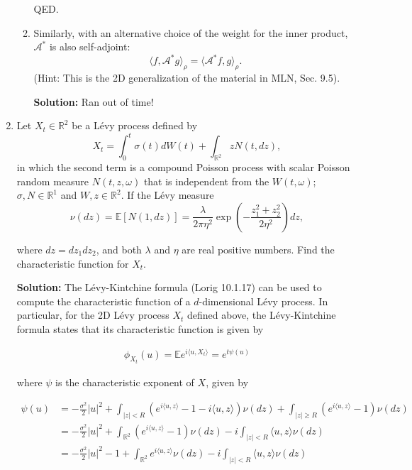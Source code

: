 \documentclass[12pt, a4paper]{article}
\begin{document}
\begin{enumerate}
\begin{enumerate}
        QED.


        \item Similarly, with an alternative choice of the weight for the inner product, $\mathcal A^*$ is also self-adjoint: $$\langle f, \mathcal A^* g \rangle_\rho = \langle \mathcal A^* f, g \rangle_\rho.$$
        (Hint: This is the 2D generalization of the material in MLN, Sec. 9.5).

        \textbf{Solution:} Ran out of time! 
        

    \end{enumerate}

    \item Let $X_t \in \mathbb R^2$ be a Lévy process defined by $$X_t = \int_0^t \sigma(t) dW(t) + \int_{\mathbb R^2} zN(t,dz),$$
    in which the second term is a compound Poisson process with scalar Poisson random measure $N(t,z,\omega)$ that is independent from the $W(t,\omega)$; $\sigma, N \in \mathbb R^1$ and $W,z \in \mathbb R^2$. If the Lévy measure $$\nu(dz) = \mathbb E[N(1,dz)]= \frac{\lambda}{2\pi \eta^2} \exp \left( - \frac{z_1^2 + z_2^2}{2\eta^2} \right)dz,$$

    where $dz=dz_1 dz_2$, and both $\lambda$ and $\eta$ are real positive numbers. Find the characteristic function for $X_t$. 

    \textbf{Solution:} The Lévy-Kintchine formula (Lorig 10.1.17) can be used to compute the characteristic function of a $d$-dimensional Lévy process. In particular, for the 2D Lévy process $X_t$ defined above, the Lévy-Kintchine formula states that its characteristic function is given by 

    \begin{align*}
        \phi_{X_t}(u) = \mathbb E e^{i \langle u , X_t \rangle} = e^{t \psi(u)}
    \end{align*}

    where $\psi$ is the characteristic exponent of $X$, given by 

    \begin{align*}
        \psi(u) &= -\frac{\sigma^2}{2} |u|^2 + \int_{|z|<R} \left( e^{i\langle u, z \rangle} - 1 - i\langle u, z \rangle \right) \nu(dz) + \int_{|z| \ge R} \left( e^{i\langle u, z \rangle} -1 \right) \nu(dz) \\
        &= -\frac{\sigma^2}{2} |u|^2 + \int_{\mathbb R^2} \left( e^{i \langle u, z \rangle} -1 \right) \nu(dz) - i \int_{|z| < R} \langle u, z \rangle \nu(dz) \\
        &= -\frac{\sigma^2}{2}|u|^2 -1 + \int_{\mathbb R^2} e^{i \langle u, z \rangle} \nu(dz) - i \int_{|z|< R} \langle u, z \rangle \nu(dz)
    \end{align*}


\end{enumerate}
\end{document}
